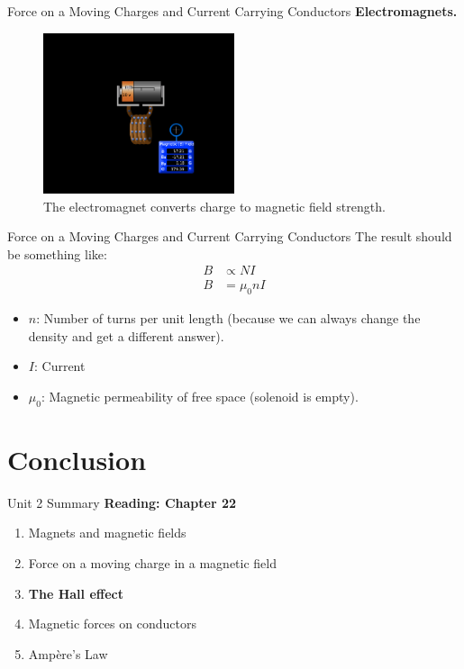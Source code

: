 \documentclass{beamer}
\begin{document}
\begin{frame}{Force on a Moving Charges and Current Carrying Conductors}
\textbf{Electromagnets.}
\begin{figure}
\centering
\includegraphics[width=0.5\textwidth]{figures/phetemmag.png}
\caption{\label{fig:phetemmag} The electromagnet converts charge to magnetic field strength.}
\end{figure}
\end{frame}

\begin{frame}{Force on a Moving Charges and Current Carrying Conductors}
The result should be something like:
\begin{align}
B &\propto N I \\
B &= \mu_0 n I
\end{align}
\begin{itemize}
\item $n$: Number of turns per unit length (because we can always change the density and get a different answer).
\item $I$: Current
\item $\mu_0$: Magnetic permeability of free space (solenoid is empty).
\end{itemize}
\end{frame}

\section{Conclusion}

\begin{frame}{Unit 2 Summary}
\textbf{Reading: Chapter 22}
\begin{enumerate}
\item Magnets and magnetic fields
\item Force on a moving charge in a magnetic field
\item \textbf{The Hall effect}
\item Magnetic forces on conductors
\item \alert{Amp\`{e}re's Law}
\end{enumerate}
\end{frame}
\end{document}
